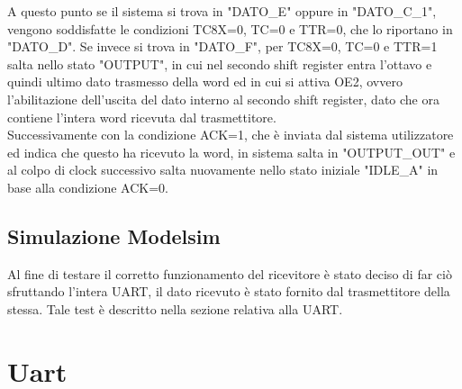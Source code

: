 \documentclass[a4paper, titlepage]{article}
\begin{document}
A questo punto se il sistema si trova in "DATO\_E" oppure in "DATO\_C\_1", vengono soddisfatte le condizioni TC8X=0, TC=0 e TTR=0, che lo riportano in "DATO\_D". Se invece si trova in "DATO\_F", per TC8X=0, TC=0 e TTR=1 salta nello stato "OUTPUT", in cui nel secondo shift register entra l'ottavo e quindi ultimo dato trasmesso della word ed in cui si attiva OE2, ovvero l'abilitazione dell'uscita del dato interno al secondo shift register, dato che ora contiene l'intera word ricevuta dal trasmettitore.\\Successivamente con la condizione ACK=1, che è inviata dal sistema utilizzatore ed indica che questo ha ricevuto la word, in sistema salta in "OUTPUT\_OUT" e al colpo di clock successivo salta nuovamente nello stato iniziale "IDLE\_A" in base alla condizione ACK=0.
\subsection{Simulazione Modelsim}
Al fine di testare il corretto funzionamento del ricevitore è stato deciso di far ciò sfruttando l'intera UART, il dato ricevuto è stato fornito dal trasmettitore della stessa. Tale test è descritto nella sezione relativa alla UART.
\newpage
\section{Uart}
\end{document}
